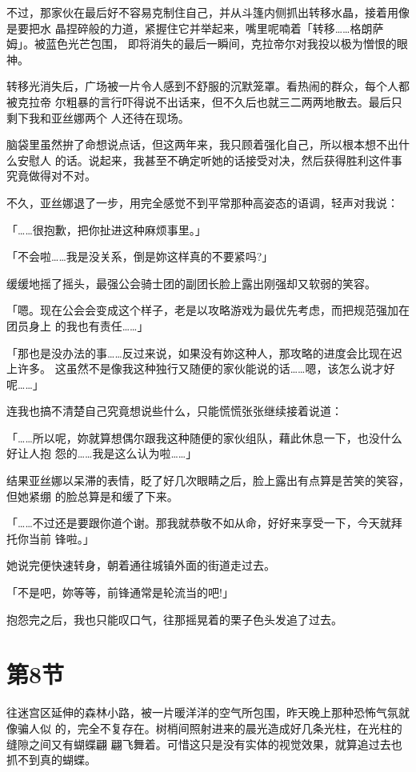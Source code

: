 \documentclass[11pt]{book}
\begin{document}
不过，那家伙在最后好不容易克制住自己，并从斗篷内侧抓出转移水晶，接着用像是要把水
晶捏碎般的力道，紧握住它并举起来，嘴里呢喃着「转移……格朗萨姆」。被蓝色光芒包围，
即将消失的最后一瞬间，克拉帝尔对我投以极为憎恨的眼神。

转移光消失后，广场被一片令人感到不舒服的沉默笼罩。看热闹的群众，每个人都被克拉帝
尔粗暴的言行吓得说不出话来，但不久后也就三二两两地散去。最后只剩下我和亚丝娜两个
人还待在现场。

脑袋里虽然拚了命想说点话，但这两年来，我只顾着强化自己，所以根本想不出什么安慰人
的话。说起来，我甚至不确定听她的话接受对决，然后获得胜利这件事究竟做得对不对。

不久，亚丝娜退了一步，用完全感觉不到平常那种高姿态的语调，轻声对我说：

「……很抱歉，把你扯进这种麻烦事里。」

「不会啦……我是没关系，倒是妳这样真的不要紧吗?」

缓缓地摇了摇头，最强公会骑士团的副团长脸上露出刚强却又软弱的笑容。

「嗯。现在公会会变成这个样子，老是以攻略游戏为最优先考虑，而把规范强加在团员身上
的我也有责任……」

「那也是没办法的事……反过来说，如果没有妳这种人，那攻略的进度会比现在迟上许多。
这虽然不是像我这种独行又随便的家伙能说的话……嗯，该怎么说才好呢……」

连我也搞不清楚自己究竟想说些什么，只能慌慌张张继续接着说道：

「……所以呢，妳就算想偶尔跟我这种随便的家伙组队，藉此休息一下，也没什么好让人抱
怨的……我是这么认为啦……」

结果亚丝娜以呆滞的表情，眨了好几次眼睛之后，脸上露出有点算是苦笑的笑容，但她紧绷
的脸总算是和缓了下来。

「……不过还是要跟你道个谢。那我就恭敬不如从命，好好来享受一下，今天就拜托你当前
锋啦。」

她说完便快速转身，朝着通往城镇外面的街道走过去。

「不是吧，妳等等，前锋通常是轮流当的吧!」

抱怨完之后，我也只能叹口气，往那摇晃着的栗子色头发追了过去。
\section{第8节}
\label{sec:org838b5b3}
往迷宫区延伸的森林小路，被一片暖洋洋的空气所包围，昨天晚上那种恐怖气氛就像骗人似
的，完全不复存在。树梢间照射进来的晨光造成好几条光柱，在光柱的缝隙之间又有蝴蝶翩
翩飞舞着。可惜这只是没有实体的视觉效果，就算追过去也抓不到真的蝴蝶。
\end{document}
